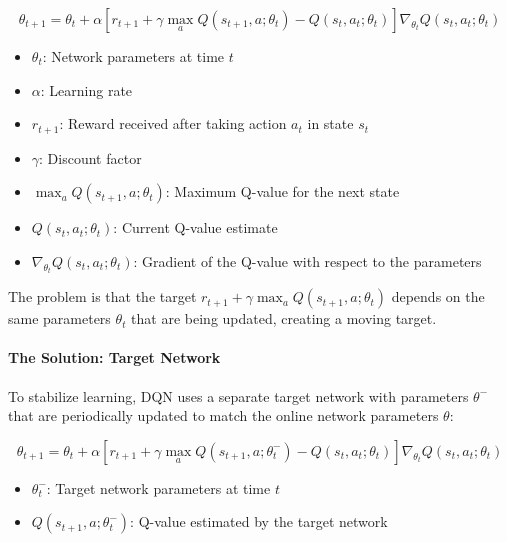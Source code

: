 \documentclass[11pt]{article}
\begin{document}
\begin{equation}
    \theta_{t+1} = \theta_t + \alpha \left[ r_{t+1} + \gamma \max_a Q(s_{t+1},a;\theta_t) - Q(s_t,a_t;\theta_t) \right] \nabla_{\theta_t} Q(s_t,a_t;\theta_t)
\end{equation}

\begin{tcolorbox}[title=Notation Overview]
\begin{itemize}
    \item $\theta_t$: Network parameters at time $t$
    \item $\alpha$: Learning rate
    \item $r_{t+1}$: Reward received after taking action $a_t$ in state $s_t$
    \item $\gamma$: Discount factor
    \item $\max_a Q(s_{t+1},a;\theta_t)$: Maximum Q-value for the next state
    \item $Q(s_t,a_t;\theta_t)$: Current Q-value estimate
    \item $\nabla_{\theta_t} Q(s_t,a_t;\theta_t)$: Gradient of the Q-value with respect to the parameters
\end{itemize}
\end{tcolorbox}

The problem is that the target $r_{t+1} + \gamma \max_a Q(s_{t+1},a;\theta_t)$ depends on the same parameters $\theta_t$ that are being updated, creating a moving target.

\paragraph{The Solution: Target Network}
To stabilize learning, DQN uses a separate target network with parameters $\theta^-$ that are periodically updated to match the online network parameters $\theta$:

\begin{equation}
    \theta_{t+1} = \theta_t + \alpha \left[ r_{t+1} + \gamma \max_a Q(s_{t+1},a;\theta^-_t) - Q(s_t,a_t;\theta_t) \right] \nabla_{\theta_t} Q(s_t,a_t;\theta_t)
\end{equation}

\begin{tcolorbox}[title=Notation Overview]
\begin{itemize}
    \item $\theta^-_t$: Target network parameters at time $t$
    \item $Q(s_{t+1},a;\theta^-_t)$: Q-value estimated by the target network
\end{itemize}
\end{tcolorbox}
\end{document}
